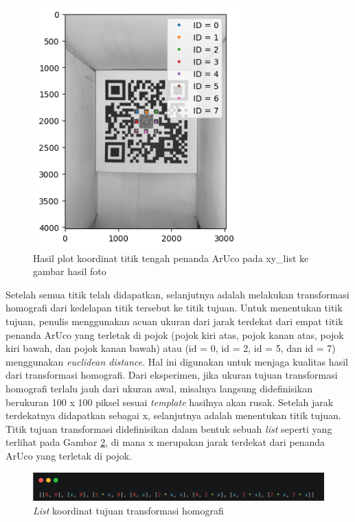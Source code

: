 \begin{figure}[h]
	\centering
	\includegraphics[width=8cm]{contents/chapter-3/3-plotxylist.png}
	\caption{Hasil plot koordinat titik tengah penanda ArUco pada xy\_list ke gambar hasil foto}
	\label{Fig: 3-plotxylist}
\end{figure}

Setelah semua titik telah didapatkan, selanjutnya adalah melakukan transformasi homografi dari kedelapan titik tersebut ke titik tujuan. Untuk menentukan titik
tujuan, penulis menggunakan acuan ukuran dari jarak terdekat dari empat titik penanda ArUco yang terletak di pojok (pojok kiri atas, pojok kanan atas, pojok
kiri bawah, dan pojok kanan bawah) atau (id = 0, id = 2, id = 5, dan id = 7) menggunakan \emph{euclidean distance}. Hal ini digunakan untuk menjaga kualitas hasil dari
transformasi homografi. Dari eksperimen, jika ukuran tujuan transformasi homografi terlalu jauh dari ukuran awal, misalnya langsung didefinisikan berukuran 100
x 100 piksel sesuai \emph{template} hasilnya akan rusak. Setelah jarak terdekatnya didapatkan sebagai x, selanjutnya adalah menentukan titik tujuan. Titik
tujuan transformasi didefinisikan dalam bentuk sebuah \emph{list} seperti yang terlihat pada Gambar \ref{Fig: 3-koordinattujuan}, di mana x merupakan jarak
terdekat dari penanda ArUco yang terletak di pojok.

\begin{figure}[h]
	\centering
	\includegraphics[width=13cm]{contents/chapter-3/3-koordinattujuan.png}
	\caption{\emph{List} koordinat tujuan transformasi homografi}
	\label{Fig: 3-koordinattujuan}
\end{figure}

